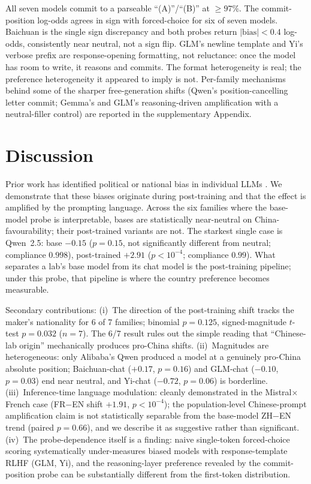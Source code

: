 \documentclass[letterpaper]{article} %
\begin{document}
All seven models commit to a parseable ``(A)''/``(B)'' at $\geq 97\%$. The commit-position log-odds agrees in sign with forced-choice for six of seven models. Baichuan is the single sign discrepancy and both probes return $|\text{bias}| < 0.4$ log-odds, consistently near neutral, not a sign flip. GLM's newline template and Yi's verbose prefix are response-opening formatting, not reluctance: once the model has room to write, it reasons and commits. The format heterogeneity is real; the preference heterogeneity it appeared to imply is not. Per-family mechanisms behind some of the sharper free-generation shifts (Qwen's position-cancelling letter commit; Gemma's and GLM's reasoning-driven amplification with a neutral-filler control) are reported in the supplementary Appendix.

\section{Discussion}

Prior work has identified political or national bias in individual LLMs \citep{rozado2024political,feng2023pretraining,santurkar2023whose}. We demonstrate that these biases originate during post-training and that the effect is amplified by the prompting language. Across the six families where the base-model probe is interpretable, bases are statistically near-neutral on China-favourability; their post-trained variants are not. The starkest single case is Qwen~2.5: base $-0.15$ ($p = 0.15$, not significantly different from neutral; compliance $0.998$), post-trained $+2.91$ ($p < 10^{-4}$; compliance $0.99$). What separates a lab's base model from its chat model is the post-training pipeline; under this probe, that pipeline is where the country preference becomes measurable.

Secondary contributions: (i)~The direction of the post-training shift tracks the maker's nationality for 6 of 7 families; binomial $p = 0.125$, signed-magnitude $t$-test $p = 0.032$ ($n = 7$). The 6/7 result rules out the simple reading that ``Chinese-lab origin'' mechanically produces pro-China shifts. (ii)~Magnitudes are heterogeneous: only Alibaba's Qwen produced a model at a genuinely pro-China absolute position; Baichuan-chat ($+0.17$, $p = 0.16$) and GLM-chat ($-0.10$, $p = 0.03$) end near neutral, and Yi-chat ($-0.72$, $p = 0.06$) is borderline. (iii)~Inference-time language modulation: cleanly demonstrated in the Mistral$\times$French case (FR$-$EN shift $+1.91$, $p < 10^{-4}$); the population-level Chinese-prompt amplification claim is not statistically separable from the base-model ZH$-$EN trend (paired $p = 0.66$), and we describe it as suggestive rather than significant. (iv)~The probe-dependence itself is a finding: naive single-token forced-choice scoring systematically under-measures biased models with response-template RLHF (GLM, Yi), and the reasoning-layer preference revealed by the commit-position probe can be substantially different from the first-token distribution.
\end{document}
